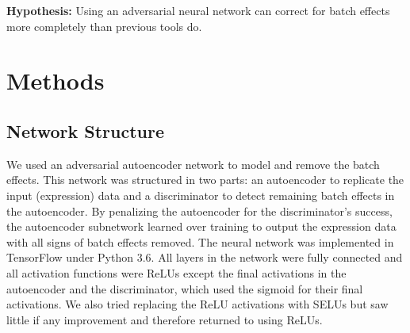 \documentclass[notitlepage]{article}
\begin{document}
\textbf{Hypothesis:}
Using an adversarial neural network can correct for batch effects more completely than previous tools do. %

\section{Methods} \label{sec:methods}

\subsection{Network Structure}

We used an adversarial autoencoder network to model and remove the batch effects.
This network was structured in two parts: an autoencoder to replicate the input (expression) data and a discriminator to detect remaining batch effects in the autoencoder.
By penalizing the autoencoder for the discriminator's success, the autoencoder subnetwork learned over training to output the expression data with all signs of batch effects removed.
The neural network was implemented in TensorFlow under Python 3.6.
All layers in the network were fully connected and all activation functions were ReLUs \cite{agarap_deep_2018} except the final activations in the autoencoder and the discriminator, which used the sigmoid for their final activations.
We also tried replacing the ReLU activations with SELUs \cite{klambauer_self-normalizing_2017} but saw little if any improvement and therefore returned to using ReLUs.
\end{document}
